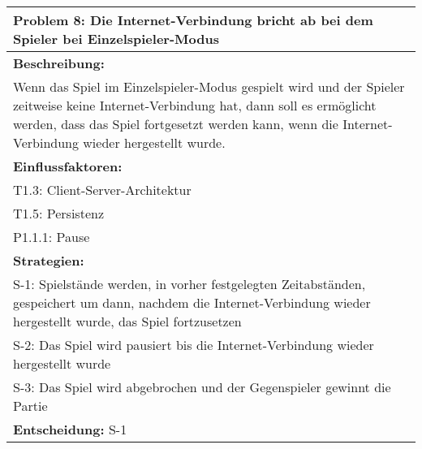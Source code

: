 \documentclass[fontsize=12pt,paper=a4,twoside]{scrartcl}
\begin{document}
\begin{longtable}{|p{15cm}|}
\hline
Problem 8: Die Internet-Verbindung bricht ab bei dem Spieler bei Einzelspieler-Modus                                                                       
\\ \hline                                                                                                                                                                                                                                                                                                                                                                                                                                                                                                                                                        
\textbf{Beschreibung:} \\
Wenn das Spiel im Einzelspieler-Modus gespielt wird und der Spieler zeitweise keine Internet-Verbindung hat, 
dann soll es ermöglicht werden, dass das Spiel fortgesetzt werden kann, wenn die Internet-Verbindung wieder hergestellt wurde.
\\ \hline
\textbf{Einflussfaktoren:} \\
T1.3: Client-Server-Architektur \\
T1.5: Persistenz \\
P1.1.1: Pause
\\ \hline
\textbf{Strategien:} \\
S-1: Spielstände werden, in vorher festgelegten Zeitabständen, gespeichert um dann, nachdem die Internet-Verbindung wieder hergestellt wurde, das Spiel fortzusetzen\\
S-2: Das Spiel wird pausiert bis die Internet-Verbindung wieder hergestellt wurde \\
S-3: Das Spiel wird abgebrochen und der Gegenspieler gewinnt die Partie
 \\ \hline
 \textbf{Entscheidung:} S-1
\\ \hline
\end{longtable}
\end{document}
